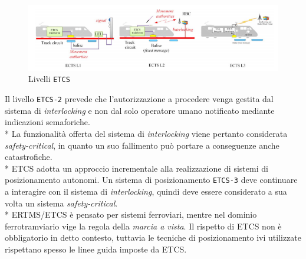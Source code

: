 \begin{figure}[h]
	\centering
	\includegraphics[width=\linewidth]{img/etcs123.png}
	\caption{Livelli \texttt{ETCS}}
	\label{fig:etcs123}
\end{figure}
Il livello \texttt{ETCS-2} prevede che l'autorizzazione a procedere venga gestita dal sistema di \emph{interlocking} e non dal solo operatore umano notificato mediante indicazioni semaforiche.\\*
La funzionalit\`a offerta del sistema di \emph{interlocking} viene pertanto considerata \emph{safety-critical}, in quanto un suo fallimento pu\`o portare a conseguenze anche catastrofiche.\cite{marocchini}\\*
ETCS adotta un approccio incrementale alla realizzazione di sistemi di posizionamento autonomi. Un sistema di posizionamento \texttt{ETCS-3} deve continuare a interagire con il sistema di \emph{interlocking}, quindi deve essere considerato a sua volta un sistema \emph{safety-critical}.\\*
ERTMS/ETCS \`e pensato per sistemi ferroviari, mentre nel dominio ferrotramviario vige la regola della \emph{marcia a vista}. Il rispetto di ETCS non \`e obbligatorio in detto contesto, tuttavia le tecniche di posizionamento ivi utilizzate rispettano spesso le linee guida imposte da ETCS. 
